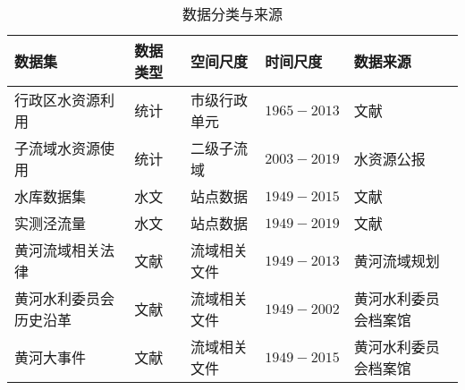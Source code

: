 \begin{table}[htbp]
    \centering
    \caption{数据分类与来源}
      \begin{tabularx}{\textwidth}{p{4cm}LLLp{3cm}}
      \toprule
      数据集   & 数据类型  & 空间尺度  & 时间尺度  & 数据来源 \\
      \midrule
      行政区水资源利用 & 统计    & 市级行政单元 & $1965-2013$ & 文献\cite{zhou2020} \\
      子流域水资源使用 & 统计    & 二级子流域 & $2003-2019$ & 水资源公报 \\
      水库数据集 & 水文    & 站点数据  & $1949-2015$ & 文献\cite{wang2019f} \\
      实测泾流量 & 水文    & 站点数据  & $1949-2019$ & 文献\cite{wang2019f} \\
      黄河流域相关法律 & 文献    & 流域相关文件 & $1949-2013$ & 黄河流域规划\cite{shuilibuhuangheshuiliweiyuanhui2010} \\
      黄河水利委员会历史沿革 & 文献    & 流域相关文件 & $1949-2002$ & 黄河水利委员会档案馆 \\
      黄河大事件 & 文献    & 流域相关文件 & $1949-2015$ & 黄河水利委员会档案馆 \\
      \bottomrule
      \end{tabularx}%
    \label{ch4:tab:data_source}%
\end{table}%
  